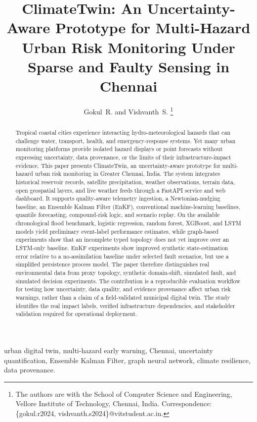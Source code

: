\documentclass[journal]{IEEEtran}
\title{ClimateTwin: An Uncertainty-Aware Prototype for Multi-Hazard Urban Risk Monitoring Under Sparse and Faulty Sensing in Chennai}
\author{Gokul~R. and Vishvanth~S.
\thanks{The authors are with the School of Computer Science and Engineering, Vellore Institute of Technology, Chennai, India. Correspondence: \{gokul.r2024, vishvanth.s2024\}@vitstudent.ac.in.}}
\begin{document}
\maketitle

\begin{abstract}
Tropical coastal cities experience interacting hydro-meteorological hazards that can challenge water, transport, health, and emergency-response systems. Yet many urban monitoring platforms provide isolated hazard displays or point forecasts without expressing uncertainty, data provenance, or the limits of their infrastructure-impact evidence. This paper presents ClimateTwin, an uncertainty-aware prototype for multi-hazard urban risk monitoring in Greater Chennai, India. The system integrates historical reservoir records, satellite precipitation, weather observations, terrain data, open geospatial layers, and live weather feeds through a FastAPI service and web dashboard. It supports quality-aware telemetry ingestion, a Newtonian-nudging baseline, an Ensemble Kalman Filter (EnKF), conventional machine-learning baselines, quantile forecasting, compound-risk logic, and scenario replay. On the available chronological flood benchmark, logistic regression, random forest, XGBoost, and LSTM models yield preliminary event-label performance estimates, while graph-based experiments show that an incomplete typed topology does not yet improve over an LSTM-only baseline. EnKF experiments show improved synthetic state-estimation error relative to a no-assimilation baseline under selected fault scenarios, but use a simplified persistence process model. The paper therefore distinguishes real environmental data from proxy topology, synthetic domain-shift, simulated fault, and simulated decision experiments. The contribution is a reproducible evaluation workflow for testing how uncertainty, data quality, and evidence provenance affect urban risk warnings, rather than a claim of a field-validated municipal digital twin. The study identifies the real impact labels, verified infrastructure dependencies, and stakeholder validation required for operational deployment.
\end{abstract}

\begin{IEEEkeywords}
urban digital twin, multi-hazard early warning, Chennai, uncertainty quantification, Ensemble Kalman Filter, graph neural network, climate resilience, data provenance.
\end{IEEEkeywords}
\end{document}
